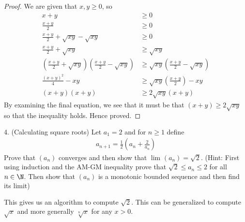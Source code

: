 \begin{proof}
	We are given that $x, y \ge 0$, so
	\begin{align}
		x + y &\ge  0 \\
		\frac{x+y}{2} &\ge 0\\
		\frac{x+y}{2} + \sqrt{xy} - \sqrt{xy}  &\ge 0\\	
		\frac{x+y}{2} + \sqrt{xy} &\ge  \sqrt{xy}\\	
		\left( \frac{x+y}{2} + \sqrt{xy}\right) \left( \frac{x+y}{2} - \sqrt{xy}  \right) &\ge  \sqrt{xy} \left( \frac{x+y}{2} - \sqrt{xy}  \right) \\		
		\frac{\left( x+y \right)^{2}}{4} - xy &\ge \sqrt{xy} \left( \frac{x+y}{2} \right) - xy \\ 
		\left( x+y \right) \left( x+y \right)  &\ge 2 \sqrt{xy} \left( x + y \right) 
	\end{align}
	By examining the final equation, we see that it must be that $\left( x + y \right) \ge 2 \sqrt{xy} $ so that the inequality holds. Hence proved.
\end{proof}

4. (Calculating square roots) Let $a_1 = 2 $ and for $n \ge 1$ define
	\begin{align}
		a_{n+1} = \frac{1}{2} \left( a_n + \frac{2}{a_n} \right) 
	\end{align}
Prove that $\left( a_n \right) $ converges and then show that $\lim_{}\left( a_n \right) = \sqrt{2} $. (Hint: First using induction and the AM-GM inequality prove that $\sqrt{2} \le a_n \le 2$ for all $n \in  \N$. Then show that $\left( a_n \right) $ is a monotonic bounded sequence and then find its limit)

\begin{remark}
	This gives us an algorithm to compute $\sqrt{2} $. This can be generalized to compute $\sqrt{x} $ and more generally $\sqrt[n]{x}$ for any $x > 0$. 
\end{remark}

